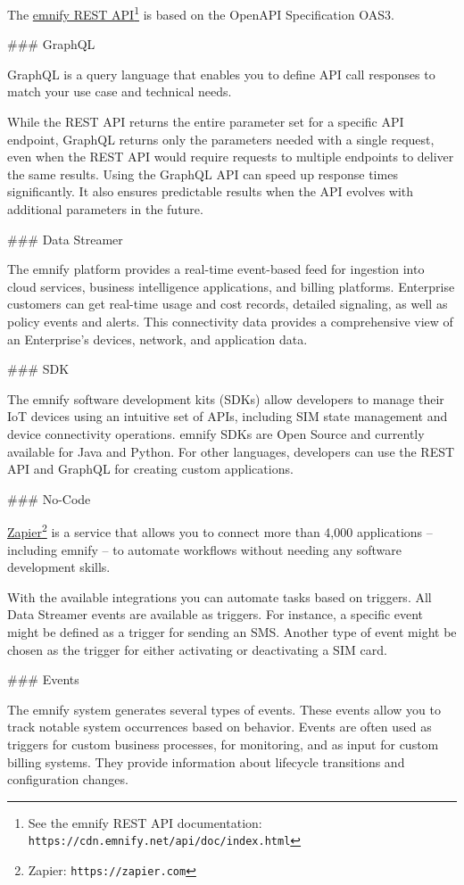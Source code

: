 \documentclass[11pt, oneside]{article}   	%
\begin{document}
The \href{https://cdn.emnify.net/api/doc/index.html}{emnify REST API}\footnote{See the emnify REST API documentation: \texttt{https://cdn.emnify.net/api/doc/index.html}} is based on the OpenAPI Specification OAS3.

\begin{markdown}
### GraphQL

GraphQL is a query language that enables you to define API call responses to match your use case and technical needs.

While the REST API returns the entire parameter set for a specific API endpoint, GraphQL returns only the parameters needed with a single request, even when the REST API would require requests to multiple endpoints to deliver the same results.
Using the GraphQL API can speed up response times significantly.
It also ensures predictable results when the API evolves with additional parameters in the future.

### Data Streamer

The emnify platform provides a real-time event-based feed for ingestion into cloud services, business intelligence applications, and billing platforms.
Enterprise customers can get real-time usage and cost records, detailed signaling, as well as policy events and alerts.
This connectivity data provides a comprehensive view of an Enterprise's devices, network, and application data.

### SDK

The emnify software development kits (SDKs) allow developers to manage their IoT devices using an intuitive set of APIs, including SIM state management and device connectivity operations.
emnify SDKs are Open Source and currently available for Java and Python.
For other languages, developers can use the REST API and GraphQL for creating custom applications.


### No-Code

\end{markdown}

\href{https://zapier.com/}{Zapier}\footnote{Zapier: \texttt{https://zapier.com}} is a service that allows you to connect more than 4,000 applications -- including emnify -- to automate workflows without needing any software development skills.
\begin{markdown}
With the available integrations you can automate tasks based on triggers.
All Data Streamer events are available as triggers.
For instance, a specific event might be defined as a trigger for sending an SMS.
Another type of event might be chosen as the trigger for either activating or deactivating a SIM card.

### Events

The emnify system generates several types of events.
These events allow you to track notable system occurrences based on behavior.
Events are often used as triggers for custom business processes, for monitoring, and as input for custom billing systems.
They provide information about lifecycle transitions and configuration changes.

\end{markdown}
\pagebreak[4]
\end{document}
